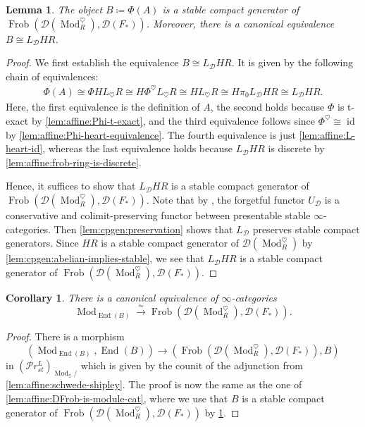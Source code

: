 \documentclass{article}
\theoremstyle{definition}
\theoremstyle{definition}
\theoremstyle{definition}
\theoremstyle{plain}
\newtheorem{lem}[defn]{Lemma}
\theoremstyle{plain}
\theoremstyle{plain}
\newtheorem{cor}[defn]{Corollary}
\theoremstyle{plain}
\theoremstyle{plain}
\theoremstyle{plain}
\theoremstyle{plain}
\theoremstyle{plain}
\theoremstyle{remark}
\theoremstyle{remark}
\theoremstyle{plain}
\theoremstyle{plain}
\theoremstyle{plain}
\theoremstyle{plain}
\theoremstyle{plain}
\newcommand{\id}[1]{\operatorname{id}_{#1}}
\newcommand{\Mod}[1]{\operatorname{Mod}_{#1}}
\newcommand{\ModDisc}[1]{\operatorname{Mod}_{#1}^{\heartsuit}}
\newcommand{\Frob}[2]{\operatorname{Frob}(#1, #2)}
\newcommand{\End}[1]{\operatorname{End}(#1)}
\renewcommand{\S}{\mathbb{S}}
\newcommand{\Cat}[1]{\mathcal{#1}}
\newcommand{\PrSt}{\mathcal{P}r^{L}_{st}}
\begin{document}
\begin{lem} \label{lem:affine:FrobD-cp-gen}
    The object $B \coloneqq \Phi(A)$ is a stable compact generator of $\Frob{\Cat D(\ModDisc{R})}{\Cat D(F_*)}$.
    Moreover, there is a canonical equivalence $B \cong L_{\Cat D}HR$.
\end{lem}
\begin{proof}
    We first establish the equivalence $B \cong L_{\Cat D}HR$.
    It is given by the following chain of equivalences:
    \begin{align*}
        \Phi(A) \cong \Phi H L_\heartsuit R \cong H \Phi^\heartsuit L_\heartsuit R \cong H L_\heartsuit R \cong H \pi_0 L_{\Cat D} H R \cong L_{\Cat D} H R.
    \end{align*}
    Here, the first equivalence is the definition of $A$,
    the second holds because $\Phi$ is t-exact by \cref{lem:affine:Phi-t-exact},
    and the third equivalence follows since $\Phi^\heartsuit \cong \id{}$ by \cref{lem:affine:Phi-heart-equivalence}.
    The fourth equivalence is just \cref{lem:affine:L-heart-id},
    whereas the last equivalence holds because $L_{\Cat D} HR$ is discrete by \cref{lem:affine:frob-ring-is-discrete}.

    Hence, it suffices to show that $L_{\Cat D}HR$ is a stable compact generator of $\Frob{\Cat D(\ModDisc{R})}{\Cat D(F_*)}$.
    Note that by \cite[Corollary 2.8]{cartmod}, the forgetful functor $U_{\Cat D}$
    is a conservative and colimit-preserving functor between presentable stable $\infty$-categories.
    Then \cref{lem:cpgen:preservation} shows that $L_{\Cat D}$ preserves stable compact generators.
    Since $HR$ is a stable compact generator of $\Cat D(\ModDisc{R})$ by \cref{lem:cpgen:abelian-implies-stable},
    we see that $L_{\Cat D}HR$ is a stable compact generator of $\Frob{\Cat D(\ModDisc{R})}{\Cat D(F_*)}$.
\end{proof}

\begin{cor} \label{lem:affine:FrobD-is-module-cat}
    There is a canonical equivalence of $\infty$-categories
    \begin{equation*}
        \Mod{\End{B}} \xrightarrow{\simeq} \Frob{\Cat D(\ModDisc{R})}{\Cat D(F_*)}.
    \end{equation*}
\end{cor}
\begin{proof}
    There is a morphism
    \begin{equation*}
        (\Mod{\End{B}}, \End{B}) \to (\Frob{\Cat D(\ModDisc{R})}{\Cat D(F_*)}, B)
    \end{equation*}
    in ${(\PrSt)}_{{\Mod{\S}}/}$ which is given by the counit of the adjunction from \cref{lem:affine:schwede-shipley}.
    The proof is now the same as the one of \cref{lem:affine:DFrob-is-module-cat},
    where we use that $B$ is a stable compact generator of $\Frob{\Cat D(\ModDisc{R})}{\Cat D(F_*)}$
    by \cref{lem:affine:FrobD-cp-gen}.
\end{proof}
\end{document}
